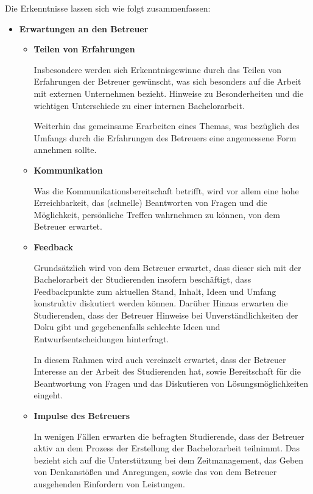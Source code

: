 \documentclass{scrreprt}
\begin{document}
\par Die Erkenntnisse lassen sich wie folgt zusammenfassen:
\begin{itemize}

\item \textbf{Erwartungen an den Betreuer}
\begin{itemize}

\item \textbf{Teilen von Erfahrungen}
\par Insbesondere werden sich Erkenntnisgewinne durch das Teilen von Erfahrungen der Betreuer gewünscht, was sich besonders auf die Arbeit mit externen Unternehmen bezieht. Hinweise zu Besonderheiten und die wichtigen Unterschiede zu einer internen Bachelorarbeit. 
\par Weiterhin das gemeinsame Erarbeiten eines Themas, was bezüglich des Umfangs durch die Erfahrungen des Betreuers eine angemessene Form annehmen sollte.

\item \textbf{Kommunikation}
\par Was die Kommunikationsbereitschaft betrifft, wird vor allem eine hohe Erreichbarkeit, das (schnelle) Beantworten von Fragen und die Möglichkeit, persönliche Treffen wahrnehmen zu können, von dem Betreuer erwartet.

\item \textbf{Feedback}
\par Grundsätzlich wird von dem Betreuer erwartet, dass dieser sich mit der Bachelorarbeit der Studierenden insofern beschäftigt, dass Feedbackpunkte zum aktuellen Stand, Inhalt, Ideen und Umfang konstruktiv diskutiert werden können. Darüber Hinaus erwarten die Studierenden, dass der Betreuer Hinweise bei Unverständlichkeiten der Doku gibt und gegebenenfalls schlechte Ideen und Entwurfsentscheidungen hinterfragt.
\par In diesem Rahmen wird auch vereinzelt erwartet, dass der Betreuer Interesse an der Arbeit des Studierenden hat, sowie Bereitschaft für die Beantwortung von Fragen und das Diskutieren von Lösungsmöglichkeiten eingeht.

\item \textbf{Impulse des Betreuers}
\par In wenigen Fällen erwarten die befragten Studierende, dass der Betreuer aktiv an dem Prozess der Erstellung der Bachelorarbeit teilnimmt. Das bezieht sich auf die Unterstützung bei dem Zeitmanagement, das Geben von Denkanstößen und Anregungen, sowie das von dem Betreuer ausgehenden Einfordern von Leistungen.
\end{itemize}


\end{itemize}
\end{document}
